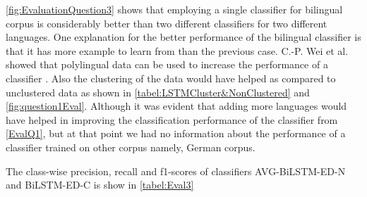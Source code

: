 \ref{fig:EvaluationQuestion3} shows that employing a single classifier for bilingual corpus is considerably better than two different classifiers for two different languages. 
One explanation for the better performance of the bilingual classifier is that it has more example to learn from than the previous case. C.-P. Wei et al. showed that polylingual data can be used to increase the performance of a classifier \cite{Wei:2014:EPD:2566999.2567111}. Also the clustering of the data would have helped as compared to unclustered data as shown in \ref{tabel:LSTMCluster&NonClustered} and  \ref{fig:question1Eval}. Although it was evident that adding more languages would have helped in improving the classification performance of the classifier from \ref{EvalQ1}, but at that point we had no information about the performance of a classifier trained on other corpus namely, German corpus.


The class-wise precision, recall and f1-scores of classifiers AVG-BiLSTM-ED-N and BiLSTM-ED-C is show in \ref{tabel:Eval3}

